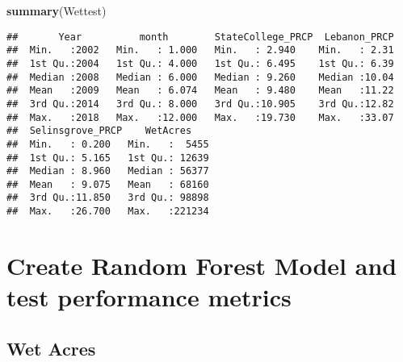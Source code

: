 \documentclass[]{article}
\newenvironment{Shaded}{\begin{snugshade}}{\end{snugshade}}
\newcommand{\KeywordTok}[1]{\textcolor[rgb]{0.13,0.29,0.53}{\textbf{{#1}}}}
\newcommand{\DataTypeTok}[1]{\textcolor[rgb]{0.13,0.29,0.53}{{#1}}}
\newcommand{\DecValTok}[1]{\textcolor[rgb]{0.00,0.00,0.81}{{#1}}}
\newcommand{\StringTok}[1]{\textcolor[rgb]{0.31,0.60,0.02}{{#1}}}
\newcommand{\CommentTok}[1]{\textcolor[rgb]{0.56,0.35,0.01}{\textit{{#1}}}}
\newcommand{\OtherTok}[1]{\textcolor[rgb]{0.56,0.35,0.01}{{#1}}}
\newcommand{\NormalTok}[1]{{#1}}
\begin{document}
\begin{Shaded}
\begin{Highlighting}[]
\KeywordTok{summary}\NormalTok{(Wettest)}
\end{Highlighting}
\end{Shaded}

\begin{verbatim}
##       Year          month        StateCollege_PRCP  Lebanon_PRCP  
##  Min.   :2002   Min.   : 1.000   Min.   : 2.940    Min.   : 2.31  
##  1st Qu.:2004   1st Qu.: 4.000   1st Qu.: 6.495    1st Qu.: 6.39  
##  Median :2008   Median : 6.000   Median : 9.260    Median :10.04  
##  Mean   :2009   Mean   : 6.074   Mean   : 9.480    Mean   :11.22  
##  3rd Qu.:2014   3rd Qu.: 8.000   3rd Qu.:10.905    3rd Qu.:12.82  
##  Max.   :2018   Max.   :12.000   Max.   :19.730    Max.   :33.07  
##  Selinsgrove_PRCP    WetAcres     
##  Min.   : 0.200   Min.   :  5455  
##  1st Qu.: 5.165   1st Qu.: 12639  
##  Median : 8.960   Median : 56377  
##  Mean   : 9.075   Mean   : 68160  
##  3rd Qu.:11.850   3rd Qu.: 98898  
##  Max.   :26.700   Max.   :221234
\end{verbatim}

\section{Create Random Forest Model and test performance
metrics}\label{create-random-forest-model-and-test-performance-metrics}

\subsection{Wet Acres}\label{wet-acres}

\begin{Shaded}
\end{Shaded}
\end{document}
